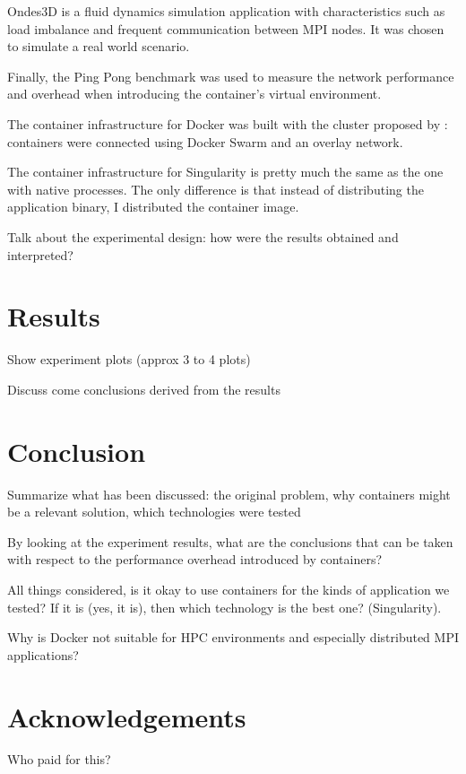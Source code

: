 \documentclass[12pt]{article}
\begin{document}
Ondes3D is a fluid dynamics simulation application with characteristics such as load imbalance and frequent communication between MPI nodes. It was chosen to simulate a real world scenario. 

Finally, the Ping Pong benchmark was used to measure the network performance and overhead when introducing the container's virtual environment.

The container infrastructure for Docker was built with the cluster proposed by \cite{7868429}: containers were connected using Docker Swarm and an overlay network.

The container infrastructure for Singularity is pretty much the same as the one with native processes. The only difference is that instead of distributing the application binary, I distributed the container image.

Talk about the experimental design: how were the results obtained and interpreted?

\section{Results}
\label{sec:org052237d}
Show experiment plots (approx 3 to 4 plots)

Discuss come conclusions derived from the results

\section{Conclusion}
\label{sec:org6c72b79}
Summarize what has been discussed: the original problem, why containers might be a relevant solution, which technologies were tested

By looking at the experiment results, what are the conclusions that can be taken with respect to the performance overhead introduced by containers?

All things considered, is it okay to use containers for the kinds of application we tested? If it is (yes, it is), then which technology is the best one? (Singularity).

Why is Docker not suitable for HPC environments and especially distributed MPI applications?

\section*{Acknowledgements}

Who paid for this?



\end{document}
